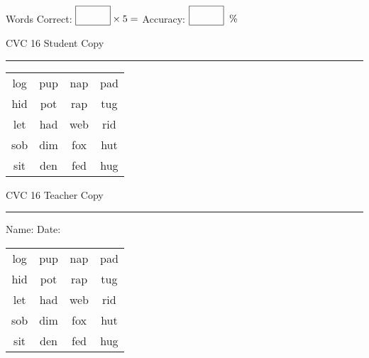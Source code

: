 \documentclass{memoir}
\begin{document}
\normalsize

Words Correct: $\fbox{\phantom{\huge 100}} \times 5 = $ Accuracy: $\fbox{\phantom{\huge 100}}\;\; \%$ 

\vfill

\newpage


\footnotesize \noindent
CVC 16 \hfill Student Copy
\smallskip
\hrule

\huge

\setlength{\tabcolsep}{14pt}
\def\arraystretch{2}

{\selectfont


\begin{vplace}[0.5]
\begin{center}
\begin{tabular}{cccc}
log & pup & nap & pad \\
hid & pot & rap & tug \\
let & had & web & rid \\
sob & dim & fox & hut \\
sit & den & fed & hug \\
\end{tabular}
\end{center}
\end{vplace}

}

\newpage

\footnotesize \noindent
CVC 16 \hfill Teacher Copy
\smallskip
\hrule

\normalsize

\vfill

\noindent
Name: \underline{\hspace{1.75in}} \hfill Date: \underline{\hspace{1in}}

\huge

{\selectfont


\begin{vplace}[0.5]
\begin{center}
\begin{tabular}{cccc}
log & pup & nap & pad \\
hid & pot & rap & tug \\
let & had & web & rid \\
sob & dim & fox & hut \\
sit & den & fed & hug \\
\end{tabular}
\end{center}
\end{vplace}



}
\end{document}
